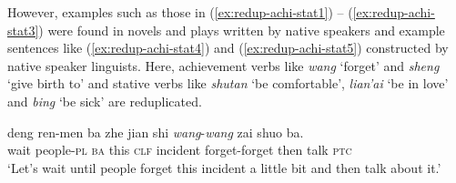 \settowidth{}

\ea
{}\label{ex:redup-stat}

\label{ex:redup-achiV}

\label{ex:redup-actV}

\label{ex:redup-semel}
\z
\z

However, examples such as those in (\ref{ex:redup-achi-stat1}) -- (\ref{ex:redup-achi-stat3}) were found in novels and plays written by native speakers and example sentences like (\ref{ex:redup-achi-stat4}) and (\ref{ex:redup-achi-stat5}) constructed by native speaker linguists.
Here, achievement verbs like \textit{wang} `forget' and \textit{sheng} `give birth to' and stative verbs like \textit{shutan} `be comfortable', \textit{lian'ai} `be in love' and \textit{bing} `be sick' are reduplicated.

\settowidth{}

\ea
\ea\label{ex:redup-achi-stat1}
\gll deng ren-men ba zhe jian shi \textit{wang}-\textit{wang} zai shuo ba.\footnotemark\\
wait people-\textsc{pl} \textsc{ba} this \textsc{clf} incident forget-forget then talk \textsc{ptc}\\
\glt `Let's wait until people forget this incident a little bit and then talk about it.'\\

